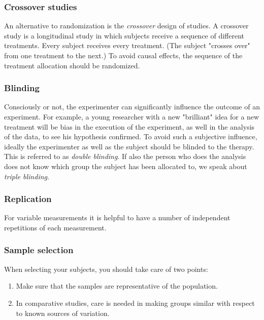 \subsubsection{Crossover studies} 
An alternative to randomization is the \emph{crossover} design of studies. A crossover study is a longitudinal study in which subjects receive a sequence of different treatments. Every subject receives every treatment. (The subject "crosses over" from one treatment to the next.) To avoid causal effects, the sequence of the treatment allocation should be randomized.

\subsubsection{Blinding} 
Consciously or not, the experimenter can significantly influence the outcome of an experiment. For example, a young researcher with a new "brilliant" idea for a new treatment will be bias in the execution of the experiment, as well in the analysis of the data, to see his hypothesis confirmed. To avoid such a subjective influence, ideally the experimenter as well as the subject should be blinded to the therapy. This is referred to as \emph{double blinding}. If also the person who does the analysis does not know which group the subject has been allocated to, we speak about \emph{triple blinding}.

\subsubsection{Replication} 
For variable measurements it is helpful to have a number of independent repetitions of each measurement.

\subsubsection{Sample selection} 
When selecting your subjects, you should take care of two points:

\begin{enumerate}
  \item Make sure that the samples are representative of the population.
  \item In comparative studies, care is needed in making groups similar with respect to known sources of variation.
\end{enumerate}

